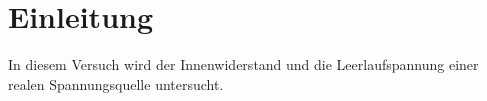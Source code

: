 
\section{Einleitung}

In diesem Versuch wird der Innenwiderstand und die Leerlaufspannung
einer realen Spannungsquelle untersucht.
